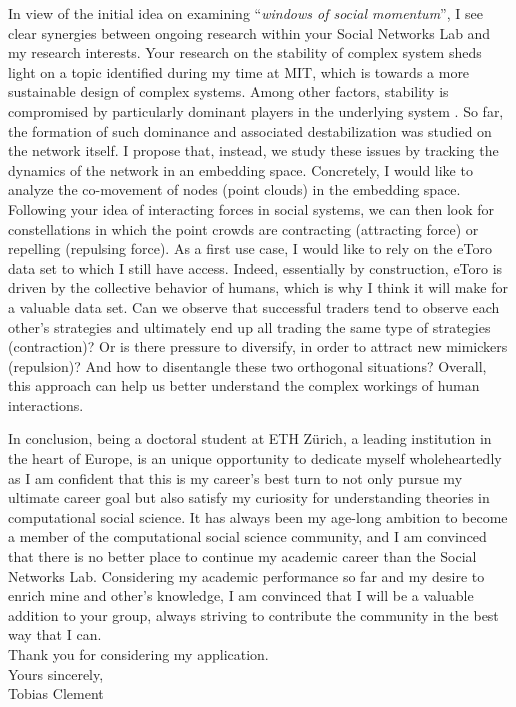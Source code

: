 In view of the initial idea on examining ``\textit{windows of social momentum}'', I see clear synergies between ongoing research within your Social Networks Lab and my research interests. 
Your research on the stability of complex system sheds light on a topic identified during my time at MIT, which is towards a more sustainable design of complex systems.
Among other factors, stability is compromised by particularly dominant players in the underlying system \cite{lera2017prediction}.
So far, the formation of such dominance and associated destabilization was studied on the network itself. 
I propose that, instead, we study these issues by tracking the dynamics of the network in an embedding space. 
Concretely, I would like to analyze the co-movement of nodes (point clouds) in the embedding space. 
Following your idea of interacting forces in social systems, we can then look for constellations in which the point crowds are contracting (attracting force) or repelling (repulsing force). 
As a first use case, I would like to rely on the eToro data set to which I still have access. 
Indeed, essentially by construction, eToro is driven by the collective behavior of humans, which is why I think it will make for a valuable data set. 
Can we observe that successful traders tend to observe each other's strategies and ultimately end up all trading the same type of strategies (contraction)? 
Or is there pressure to diversify, in order to attract new mimickers (repulsion)? 
And how to disentangle these two orthogonal situations? 
Overall, this approach can help us better understand the complex workings of human interactions. 

In conclusion, being a doctoral student at ETH Zürich, a leading institution in the heart of Europe, is an unique opportunity to dedicate myself wholeheartedly as I am confident that this is my career's best turn to not only pursue my ultimate career goal but also satisfy my curiosity for understanding theories in computational social science. 
It has always been my age-long ambition to become a member of the computational social science community, and I am convinced that there is no better place to continue my academic career than the Social Networks Lab. 
Considering my academic performance so far and my desire to enrich mine and other's knowledge, I am convinced that I will be a valuable addition to your group, always striving to contribute the community in the best way that I can.\\

Thank you for considering my application.\\

Yours sincerely,\\
Tobias Clement\\\\\
